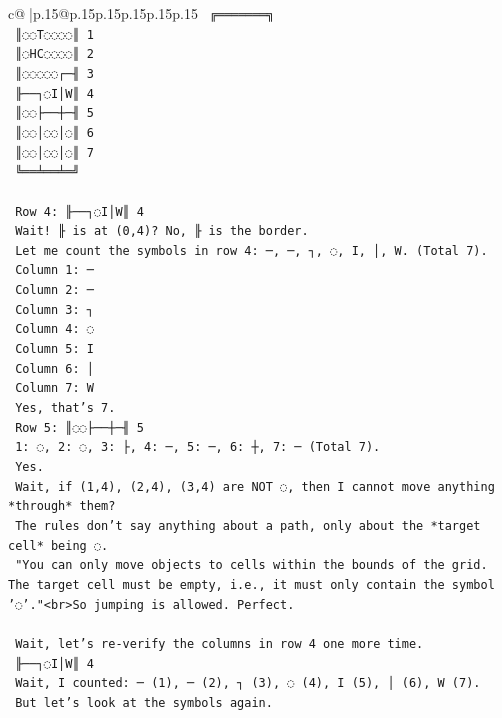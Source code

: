 \documentclass{article}
\begin{document}
{\begin{supertabular}{c@{$\;$}|p{.15\linewidth}@{}p{.15\linewidth}p{.15\linewidth}p{.15\linewidth}p{.15\linewidth}p{.15\linewidth}}
{{{\texttt{    ╔═══════╗} \\
\texttt{    ║◌◌T◌◌◌◌║ 1} \\
\texttt{    ║◌HC◌◌◌◌║ 2} \\
\texttt{    ║◌◌◌◌◌┌─╢ 3} \\
\texttt{    ╟──┐◌I│W║ 4} \\
\texttt{    ║◌◌├──┼─╢ 5} \\
\texttt{    ║◌◌│◌◌│◌║ 6} \\
\texttt{    ║◌◌│◌◌│◌║ 7} \\
\texttt{    ╚══╧══╧═╝} \\
\\ 
\texttt{    Row 4: ╟──┐◌I│W║ 4} \\
\texttt{    Wait! ╟ is at (0,4)? No, ╟ is the border.} \\
\texttt{    Let me count the symbols in row 4: ─, ─, ┐, ◌, I, │, W. (Total 7).} \\
\texttt{    Column 1: ─} \\
\texttt{    Column 2: ─} \\
\texttt{    Column 3: ┐} \\
\texttt{    Column 4: ◌} \\
\texttt{    Column 5: I} \\
\texttt{    Column 6: │} \\
\texttt{    Column 7: W} \\
\texttt{    Yes, that's 7.} \\
\texttt{    Row 5: ║◌◌├──┼─╢ 5} \\
\texttt{    1: ◌, 2: ◌, 3: ├, 4: ─, 5: ─, 6: ┼, 7: ─ (Total 7).} \\
\texttt{    Yes.} \\
\texttt{    Wait, if (1,4), (2,4), (3,4) are NOT ◌, then I cannot move anything *through* them?} \\
\texttt{    The rules don't say anything about a path, only about the *target cell* being ◌.} \\
\texttt{    "You can only move objects to cells within the bounds of the grid. The target cell must be empty, i.e., it must only contain the symbol '◌'."<br>So jumping is allowed. Perfect.} \\
\\ 
\texttt{    Wait, let's re{-}verify the columns in row 4 one more time.} \\
\texttt{    ╟──┐◌I│W║ 4} \\
\texttt{    Wait, I counted: ─ (1), ─ (2), ┐ (3), ◌ (4), I (5), │ (6), W (7).} \\
\texttt{    But let's look at the symbols again.} \\
}}}
\end{supertabular}}
\end{document}
